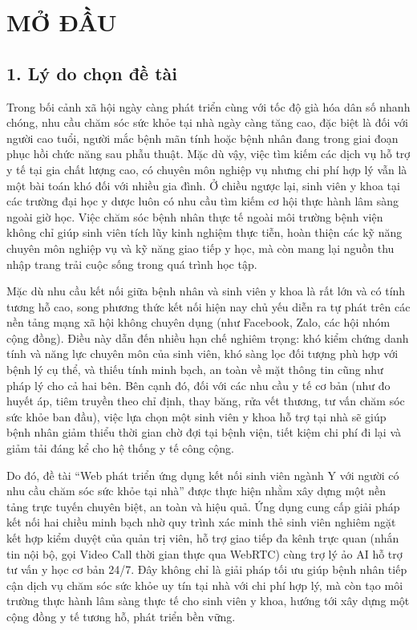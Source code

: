 \documentclass[13pt,a4paper]{extreport}
\begin{document}
\newpage

\chapter*{MỞ ĐẦU}

\section*{1. Lý do chọn đề tài}

Trong bối cảnh xã hội ngày càng phát triển cùng với tốc độ già hóa dân số nhanh chóng, nhu cầu chăm sóc sức khỏe tại nhà ngày càng tăng cao, đặc biệt là đối với người cao tuổi, người mắc bệnh mãn tính hoặc bệnh nhân đang trong giai đoạn phục hồi chức năng sau phẫu thuật. Mặc dù vậy, việc tìm kiếm các dịch vụ hỗ trợ y tế tại gia chất lượng cao, có chuyên môn nghiệp vụ nhưng chi phí hợp lý vẫn là một bài toán khó đối với nhiều gia đình. Ở chiều ngược lại, sinh viên y khoa tại các trường đại học y dược luôn có nhu cầu tìm kiếm cơ hội thực hành lâm sàng ngoài giờ học. Việc chăm sóc bệnh nhân thực tế ngoài môi trường bệnh viện không chỉ giúp sinh viên tích lũy kinh nghiệm thực tiễn, hoàn thiện các kỹ năng chuyên môn nghiệp vụ và kỹ năng giao tiếp y học, mà còn mang lại nguồn thu nhập trang trải cuộc sống trong quá trình học tập.

Mặc dù nhu cầu kết nối giữa bệnh nhân và sinh viên y khoa là rất lớn và có tính tương hỗ cao, song phương thức kết nối hiện nay chủ yếu diễn ra tự phát trên các nền tảng mạng xã hội không chuyên dụng (như Facebook, Zalo, các hội nhóm cộng đồng). Điều này dẫn đến nhiều hạn chế nghiêm trọng: khó kiểm chứng danh tính và năng lực chuyên môn của sinh viên, khó sàng lọc đối tượng phù hợp với bệnh lý cụ thể, và thiếu tính minh bạch, an toàn về mặt thông tin cũng như pháp lý cho cả hai bên. Bên cạnh đó, đối với các nhu cầu y tế cơ bản (như đo huyết áp, tiêm truyền theo chỉ định, thay băng, rửa vết thương, tư vấn chăm sóc sức khỏe ban đầu), việc lựa chọn một sinh viên y khoa hỗ trợ tại nhà sẽ giúp bệnh nhân giảm thiểu thời gian chờ đợi tại bệnh viện, tiết kiệm chi phí đi lại và giảm tải đáng kể cho hệ thống y tế công cộng.

Do đó, đề tài ``Web phát triển ứng dụng kết nối sinh viên ngành Y với người có nhu cầu chăm sóc sức khỏe tại nhà'' được thực hiện nhằm xây dựng một nền tảng trực tuyến chuyên biệt, an toàn và hiệu quả. Ứng dụng cung cấp giải pháp kết nối hai chiều minh bạch nhờ quy trình xác minh thẻ sinh viên nghiêm ngặt kết hợp kiểm duyệt của quản trị viên, hỗ trợ giao tiếp đa kênh trực quan (nhắn tin nội bộ, gọi Video Call thời gian thực qua WebRTC) cùng trợ lý ảo AI hỗ trợ tư vấn y học cơ bản 24/7. Đây không chỉ là giải pháp tối ưu giúp bệnh nhân tiếp cận dịch vụ chăm sóc sức khỏe uy tín tại nhà với chi phí hợp lý, mà còn tạo môi trường thực hành lâm sàng thực tế cho sinh viên y khoa, hướng tới xây dựng một cộng đồng y tế tương hỗ, phát triển bền vững.
\end{document}
